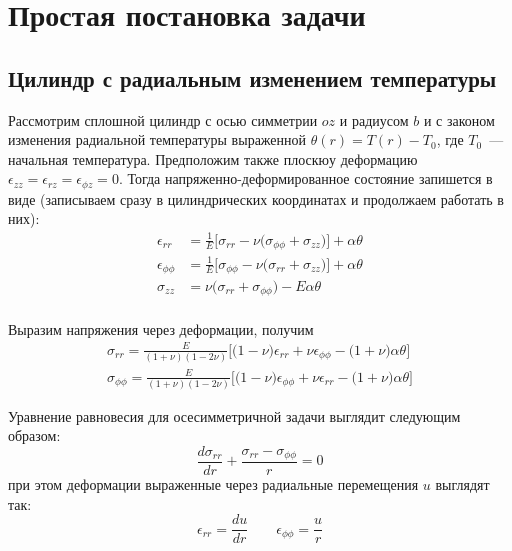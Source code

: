 \chapter{Простая постановка задачи}\label{ch:ch1}

\section{Цилиндр с радиальным изменением температуры}\label{sec:ch1/sec1}

Рассмотрим сплошной цилиндр с осью симметрии \(oz\) и радиусом \(b\) и с законом изменения радиальной температуры выраженной \(\theta(r)=T(r)-T_0\), где \(T_0\)~--- начальная температура. Предположим также плоскюу деформацию \(\epsilon_{zz}=\epsilon_{rz}=\epsilon_{\phi z}=0\). Тогда напряженно-деформированное состояние запишется в виде (записываем сразу в цилиндрических координатах и продолжаем работать в них):
\begin{equation}
	\label{eq:ch1:equation1}
\begin{split}
	\epsilon_{rr} &= \frac{1}{E} \big [\sigma_{rr} - \nu \big(\sigma_{\phi\phi} + \sigma_{zz}\big) \big] + \alpha \theta \\
	\epsilon_{\phi\phi} &= \frac{1}{E} \big [\sigma_{\phi\phi} - \nu \big(\sigma_{rr} + \sigma_{zz}\big) \big] + \alpha \theta \\
	\sigma_{zz} &= \nu \big(\sigma_{rr} + \sigma_{\phi\phi}\big) - E\alpha\theta \\
\end{split}
\end{equation}	

Выразим напряжения через деформации, получим
\begin{equation}
	\label{eq:ch1:equation2}
	\begin{split}
		\sigma_{rr} = \frac{E}{(1+\nu)(1-2\nu)} \big[\big(1-\nu \big)\epsilon_{rr} + \nu\epsilon_{\phi\phi} - \big(1+\nu\big )\alpha\theta\big] \\
		\sigma_{\phi\phi} = \frac{E}{(1+\nu)(1-2\nu)} \big[\big(1-\nu \big)\epsilon_{\phi\phi} + \nu\epsilon_{rr} - \big(1+\nu\big )\alpha\theta\big] 
	\end{split}
\end{equation}

Уравнение равновесия для осесимметричной задачи выглядит следующим образом:
\begin{equation}
	\label{eq:ch1:equation3}
		\frac {d\sigma_{rr} }{dr} + \frac {\sigma_{rr}-\sigma_{\phi\phi}}{r}=0
\end{equation}
при этом деформации выраженные через радиальные перемещения \(u\) выглядят так:
\begin{equation}
	\label{eq:ch1:equation4}
	\epsilon_{rr} = \frac{du}{dr} \qquad \epsilon_{\phi\phi} = \frac{u}{r}
\end{equation}

